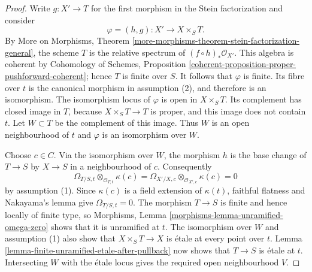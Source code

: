 \begin{proof}
Write $g : X' \to T$ for the first morphism in the Stein factorization and
consider
$$
\varphi = (h, g) : X' \longrightarrow X \times_S T.
$$
By More on Morphisms, Theorem
\ref{more-morphisms-theorem-stein-factorization-general}, the scheme $T$ is
the relative spectrum of $(f \circ h)_*\mathcal{O}_{X'}$. This algebra is
coherent by Cohomology of Schemes, Proposition
\ref{coherent-proposition-proper-pushforward-coherent}; hence $T$ is finite
over $S$. It follows that $\varphi$ is finite. Its fibre over $t$ is the
canonical morphism in assumption (2), and therefore is an isomorphism. The
isomorphism locus of $\varphi$ is open in $X \times_S T$. Its complement has
closed image in $T$, because
$X \times_S T \to T$ is proper, and this image does not contain $t$.
Let $W \subset T$ be the complement of this image. Thus $W$ is an open
neighbourhood of $t$ and $\varphi$ is an isomorphism over $W$.

\medskip\noindent
Choose $c \in C$. Via the isomorphism over $W$, the morphism $h$ is the base
change of $T \to S$ by $X \to S$ in a neighbourhood of $c$. Consequently
$$
\Omega_{T/S, t} \otimes_{\mathcal{O}_{T, t}} \kappa(c)
= \Omega_{X'/X, c} \otimes_{\mathcal{O}_{X', c}} \kappa(c) = 0
$$
by assumption (1). Since $\kappa(c)$ is a field extension of $\kappa(t)$,
faithful flatness and Nakayama's lemma give $\Omega_{T/S, t} = 0$.
The morphism $T \to S$ is finite and hence locally of finite type, so
Morphisms, Lemma \ref{morphisms-lemma-unramified-omega-zero} shows that it is
unramified at $t$. The isomorphism over $W$ and assumption (1) also show that
$X \times_S T \to X$ is \'etale at every point over $t$. Lemma
\ref{lemma-finite-unramified-etale-after-pullback} now shows that $T \to S$ is
\'etale at $t$. Intersecting $W$ with the \'etale locus gives the required
open neighbourhood $V$.
\end{proof}

